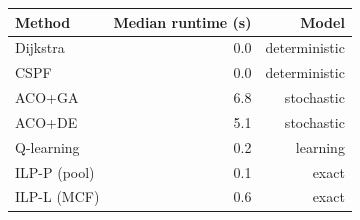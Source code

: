 \begin{tabular}{@{}lrr@{}}
\toprule
Method & Median runtime (s) & Model\\
\midrule
Dijkstra & 0.0 & deterministic\\
CSPF & 0.0 & deterministic\\
ACO+GA & 6.8 & stochastic\\
ACO+DE & 5.1 & stochastic\\
Q-learning & 0.2 & learning\\
ILP-P (pool) & 0.1 & exact\\
ILP-L (MCF) & 0.6 & exact\\
\bottomrule
\end{tabular}
